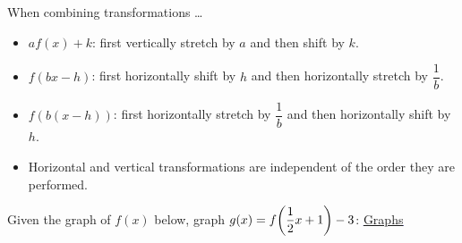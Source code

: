 \documentclass[../mathNotesPreamble]{subfiles}
\begin{document}
  \TabPositions{30mm}
  \begin{thmBox*}
    When combining transformations \dots
    \begin{itemize}
      \item
        $af(x)+k$: \tab first vertically stretch by $a$ and then shift by $k$.
      \item
        $f(bx-h)$: \tab first horizontally shift by $h$ and then horizontally stretch by $\dfrac{1}{b}$.
      \item
        $f(b(x-h))$: \tab first horizontally stretch by $\dfrac{1}{b}$ and then horizontally shift by $h$.
      \item
        Horizontal and vertical transformations are independent of the order they are performed.
    \end{itemize}
  \end{thmBox*}

  \begin{ex*}
    Given the graph of $f(x)$ below, graph $g(x)=f{\left(\dfrac{1}{2}x+1\right)}-3$:
    \textcolor{blue}{\underline{\href{https://www.desmos.com/calculator/orwapzvycw}{Graphs}}}
    \begin{center}
    \end{center}
  \end{ex*}
  \pagebreak


  \pagebreak
\end{document}
